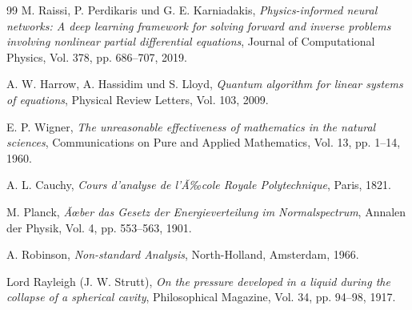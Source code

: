 ﻿\documentclass[12pt,a4paper]{article}
\theoremstyle{definition}
\theoremstyle{remark}
\begin{document}
\begin{thebibliography}{99}
M. Raissi, P. Perdikaris und G. E. Karniadakis, \textit{Physics-informed neural networks: A deep learning framework for solving forward and inverse problems involving nonlinear partial differential equations}, Journal of Computational Physics, Vol. 378, pp. 686--707, 2019.

A. W. Harrow, A. Hassidim und S. Lloyd, \textit{Quantum algorithm for linear systems of equations}, Physical Review Letters, Vol. 103, 2009.

E. P. Wigner, \textit{The unreasonable effectiveness of mathematics in the natural sciences}, Communications on Pure and Applied Mathematics, Vol. 13, pp. 1--14, 1960.

A. L. Cauchy, \textit{Cours d'analyse de l'Ã‰cole Royale Polytechnique}, Paris, 1821.

M. Planck, \textit{Ãœber das Gesetz der Energieverteilung im Normalspectrum}, Annalen der Physik, Vol. 4, pp. 553--563, 1901.

A. Robinson, \textit{Non-standard Analysis}, North-Holland, Amsterdam, 1966.

Lord Rayleigh (J. W. Strutt), \textit{On the pressure developed in a liquid during the collapse of a spherical cavity}, Philosophical Magazine, Vol. 34, pp. 94--98, 1917.

\end{thebibliography}
\end{document}
